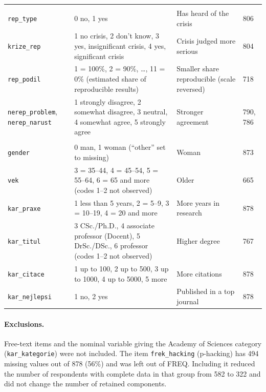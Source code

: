 \documentclass[11pt,a4paper]{article}
\newcommand{\var}[1]{\texttt{#1}}
\begin{document}
{\begin{longtable}{@{}L{2.7cm} L{5.9cm} L{3.3cm} L{2.6cm}@{}}
\addlinespace
{}\\
\var{rep\_type} & 0 no, 1 yes & Has heard of the crisis & 806\\
\var{krize\_rep} & 1 no crisis, 2 don't know, 3 yes, insignificant crisis, 4 yes, significant crisis & Crisis judged more serious & 804\\
\var{rep\_podil} & 1 = 100\%, 2 = 90\%, \dots, 11 = 0\% (estimated share of reproducible results) & Smaller share reproducible (scale reversed) & 718\\
\var{nerep\_problem}, \var{nerep\_narust} & 1 strongly disagree, 2 somewhat disagree, 3 neutral, 4 somewhat agree, 5 strongly agree & Stronger agreement & 790, 786\\
\addlinespace
{}\\
\var{gender} & 0 man, 1 woman (``other'' set to missing) & Woman & 873\\
\var{vek} & 3 = 35--44, 4 = 45--54, 5 = 55--64, 6 = 65 and more (codes 1--2 not observed) & Older & 665\\
\var{kar\_praxe} & 1 less than 5 years, 2 = 5--9, 3 = 10--19, 4 = 20 and more & More years in research & 878\\
\var{kar\_titul} & 3 CSc./Ph.D., 4 associate professor (Docent), 5 DrSc./DSc., 6 professor (codes 1--2 not observed) & Higher degree & 767\\
\var{kar\_citace} & 1 up to 100, 2 up to 500, 3 up to 1000, 4 up to 5000, 5 more & More citations & 878\\
\var{kar\_nejlepsi} & 1 no, 2 yes & Published in a top journal & 878\\
\end{longtable}
}


\paragraph{Exclusions.}
Free-text items and the nominal variable giving the Academy of Sciences category (\var{kar\_kategorie}) were not included. The item \var{frek\_hacking} (p-hacking) has 494 missing values out of 878 (56\%) and was left out of FREQ. Including it reduced the number of respondents with complete data in that group from 582 to 322 and did not change the number of retained components.
\end{document}
